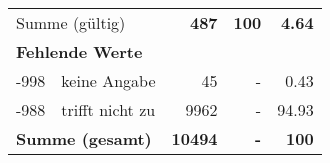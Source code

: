 \begin{longtable}{lXrrr}
     \midrule
     \multicolumn{2}{l}{Summe (gültig)} &
       \textbf{\num{487}} &
     \textbf{\num{100}} &
       \textbf{\num[round-mode=places,round-precision=2]{4.64}} \\
     \multicolumn{5}{l}{\textbf{Fehlende Werte}}\\
       -998 &
       keine Angabe &
         \num{45} &
        - &
         \num[round-mode=places,round-precision=2]{0.43} \\
       -988 &
       trifft nicht zu &
         \num{9962} &
        - &
         \num[round-mode=places,round-precision=2]{94.93} \\
     \midrule
     \multicolumn{2}{l}{\textbf{Summe (gesamt)}} &
          \textbf{\num{10494}} &
        \textbf{-} &
        \textbf{\num{100}} \\
     \bottomrule
     \end{longtable}
     
